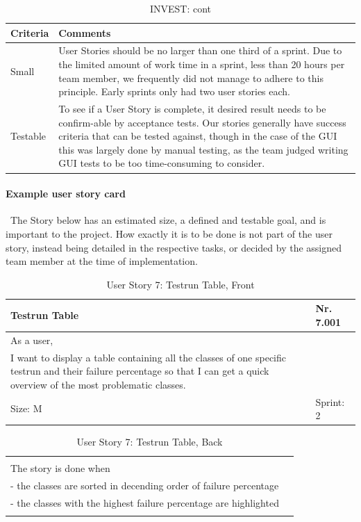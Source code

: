 \begin{table}[h!]
  \caption{INVEST: cont}
  \centering
  \begin{tabular}{|p{3cm} | p{10cm}|}
	\hline  	 
  	 Criteria & Comments \\ 
  	 \hline
  	 \hline
  	Small & User Stories should be no larger than one third of a sprint. Due to the limited amount of work time in a sprint, less than 20 hours per team member, we frequently did not manage to adhere to this principle. Early sprints only had two user stories each.  \\ 
  	\hline
  	Testable & To see if a User Story is complete, it desired result needs to be confirm-able by acceptance tests. Our stories generally have success criteria that can be tested against, though in the case of the GUI this was largely done by manual testing, as the team judged writing GUI tests to be too time-consuming to consider. \\ 
  	\hline
  \end{tabular}
\end{table}

\paragraph{Example user story card} \
The Story below has an estimated size, a defined and testable goal, and is important to the project. How exactly it is to be done is not part of the user story, instead being detailed in the respective tasks, or decided by the assigned team member at the time of implementation. 
\begin{table}[h]
  \caption{User Story 7: Testrun Table, Front}
  \label{Story 7 Example}
  \centering
  \begin{tabular}{|p{9cm} p{2cm}|}
	\hline  	
  	Testrun Table & Nr. 7.001  \\ 
  	\hline
  	As a user, &    \\ 
  	I want to display a table containing all the classes of one specific testrun and their failure percentage so that I can get a quick overview of the most problematic classes. &    \\ 
  	Size: M & Sprint: 2 \\ 
  	\hline
  \end{tabular}
\end{table}
\begin{table}[!h]
  \caption{User Story 7: Testrun Table, Back}
  \label{Story 7 Example}  \centering
  \begin{tabular}{|p{10cm} p{1cm}|}
    \hline
  	  &    \\ 
  	The story is done when &    \\ 
  	 - the classes are sorted in decending order of failure percentage &    \\ 
  	 - the classes with the highest failure percentage are highlighted &   \\ 
  	  &     \\ 
  	\hline
  \end{tabular}
\end{table}

